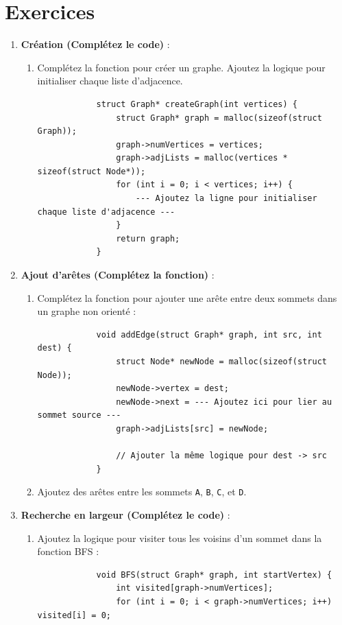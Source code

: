 \section*{Exercices}
\begin{enumerate}
	\item \textbf{Création (Complétez le code)} :
	\begin{enumerate}
		\item Complétez la fonction pour créer un graphe. Ajoutez la logique pour initialiser chaque liste d’adjacence.
		\begin{verbatim}
			struct Graph* createGraph(int vertices) {
				struct Graph* graph = malloc(sizeof(struct Graph));
				graph->numVertices = vertices;
				graph->adjLists = malloc(vertices * sizeof(struct Node*));
				for (int i = 0; i < vertices; i++) {
					--- Ajoutez la ligne pour initialiser chaque liste d'adjacence ---
				}
				return graph;
			}
		\end{verbatim}
	\end{enumerate}
	
	\item \textbf{Ajout d’arêtes (Complétez la fonction)} :
	\begin{enumerate}
		\item Complétez la fonction pour ajouter une arête entre deux sommets dans un graphe non orienté :
		\begin{verbatim}
			void addEdge(struct Graph* graph, int src, int dest) {
				struct Node* newNode = malloc(sizeof(struct Node));
				newNode->vertex = dest;
				newNode->next = --- Ajoutez ici pour lier au sommet source ---
				graph->adjLists[src] = newNode;
				
				// Ajouter la même logique pour dest -> src
			}
		\end{verbatim}
		\item Ajoutez des arêtes entre les sommets \texttt{A}, \texttt{B}, \texttt{C}, et \texttt{D}.
	\end{enumerate}
	
	\item \textbf{Recherche en largeur (Complétez le code)} :
	\begin{enumerate}
		\item Ajoutez la logique pour visiter tous les voisins d’un sommet dans la fonction BFS :
		\begin{verbatim}
			void BFS(struct Graph* graph, int startVertex) {
				int visited[graph->numVertices];
				for (int i = 0; i < graph->numVertices; i++) visited[i] = 0;
				

\end{verbatim}
\end{enumerate}
\end{enumerate}

